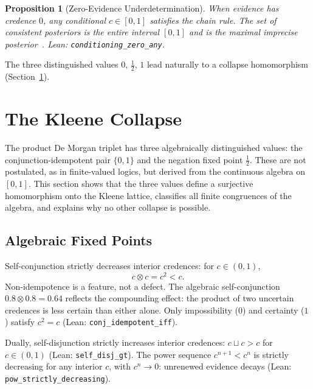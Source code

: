 \documentclass[11pt,a4paper]{article}
\newtheorem{proposition}[theorem]{Proposition}
\newcommand{\conjc}{\otimes}
\newcommand{\disjc}{\sqcup}
\begin{document}
\begin{proposition}[Zero-Evidence Underdetermination]
\label{prop:zero-underdet}
When evidence has credence $0$, any conditional
$c \in [0,1]$ satisfies the chain rule.
The set of consistent posteriors is the entire interval $[0,1]$
and is the maximal imprecise
posterior~\cite{walley1991,levi1980}.
Lean: \texttt{conditioning\_zero\_any}.
\end{proposition}

The three distinguished values $0$, $\tfrac{1}{2}$, $1$ lead
naturally to a collapse homomorphism (Section~\ref{sec:collapse}).

\section{The Kleene Collapse}
\label{sec:collapse}

The product De Morgan triplet has three algebraically distinguished
values: the conjunction-idempotent pair $\{0, 1\}$ and the negation
fixed point $\tfrac{1}{2}$.
These are not postulated, as in finite-valued logics, but derived
from the continuous algebra on $[0,1]$.
This section shows that the three values define a surjective
homomorphism onto the Kleene lattice, classifies all finite
congruences of the algebra, and explains why no other collapse is
possible.

\subsection{Algebraic Fixed Points}
\label{sec:fixed-points}

Self-conjunction strictly decreases interior credences:
for $c \in (0,1)$,
\begin{equation}
  c \conjc c = c^2 < c.
  \label{eq:self-conj}
\end{equation}
Non-idempotence is a feature, not a defect.
The algebraic self-conjunction $0.8 \conjc 0.8 = 0.64$ reflects
the compounding effect: the product of two uncertain credences is
less certain than either alone.
Only impossibility ($0$) and certainty ($1$) satisfy $c^2 = c$
(Lean: \texttt{conj\_idempotent\_iff}).

Dually, self-disjunction strictly increases interior credences:
$c \disjc c > c$ for $c \in (0,1)$
(Lean: \texttt{self\_disj\_gt}).
The power sequence $c^{n+1} < c^n$ is strictly decreasing for any
interior $c$, with $c^n \to 0$: unrenewed evidence decays
(Lean: \texttt{pow\_strictly\_decreasing}).
\end{document}
